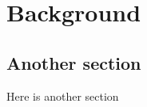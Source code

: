 \chapter{Background}
\label{chap:Background}

\section{Another section}
\label{sec:another}

Here is another section

